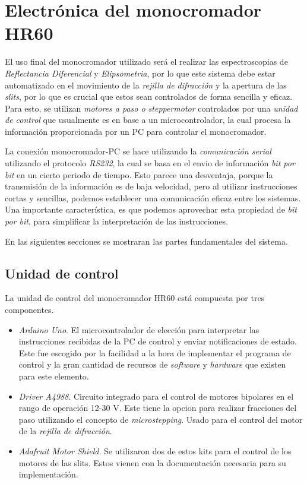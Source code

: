 \section{Electrónica del monocromador HR60}
\label{sec:ch2-electronic}
El uso final del monocromador utilizado será el realizar las espectroscopias de \textit{Reflectancia Diferencial} y \textit{Elipsometria}, por lo que este sistema debe estar automatizado en el movimiento de la \textit{rejilla de difracción} y la apertura de las \textit{slits}, por lo que es crucial que estos sean controlados de forma sencilla y eficaz. Para esto, se utilizan \textit{motores a paso o steppermotor} controlados por una \textit{unidad de control} que usualmente es en base a un microcontrolador, la cual procesa la información proporcionada por un PC para controlar el monocromador. 

La conexión monocromador-PC se hace utilizando la \textit{comunicación serial} utilizando el protocolo \textit{RS232}, la cual se basa en el envio de información \textit{bit por bit} en un cierto periodo de tiempo. Esto parece una desventaja, porque la transmisión de la información es de baja velocidad, pero al utilizar instrucciones cortas y sencillas, podemos establecer una comunicación eficaz entre los sistemas. Una importante característica, es que podemos aprovechar esta propiedad de \textit{bit por bit}, para simplificar la interpretación de las instrucciones.

En las siguientes secciones se mostraran las partes fundamentales del sistema.

\subsection{Unidad de control}
\label{sec:ch2-control-unit}
La unidad de control del monocromador HR60 está compuesta por tres componentes.
\begin{itemize}
    \item \textit{Arduino Uno}. El microcontrolador de elección para interpretar las instrucciones recibidas de la PC de control y enviar notificaciones de estado. Este fue escogido por la facilidad a la hora de implementar el programa de control y la gran cantidad de recursos de \textit{software} y \textit{hardware} que existen para este elemento.
    \item \textit{Driver A4988}. Circuito integrado para el control de motores bipolares en el rango de operación 12-30 V. Este tiene la opcion para realizar fracciones del paso utilizando el concepto de \textit{microstepping}. Usado para el control del motor de la \textit{rejilla de difracción}.
    \item \textit{Adafruit Motor Shield}. Se utilizaron dos de estos kits para el control de los motores de las slits. Estos vienen con la documentación necesaria para su implementación.
\end{itemize}

